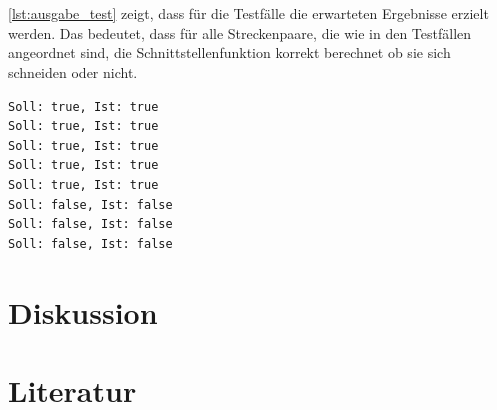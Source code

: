 \documentclass[12pt]{scrartcl}
\begin{document}
\ \\~\\
\autoref{lst:ausgabe_test} zeigt, dass für die Testfälle die erwarteten Ergebnisse erzielt werden.
Das bedeutet, dass für alle Streckenpaare, die wie in den Testfällen angeordnet sind, die Schnittstellenfunktion korrekt berechnet ob sie sich schneiden oder nicht.\\

\begin{lstlisting}[style=Terminal, caption={testing.cpp: Ausgabe Konsole},captionpos=b, label={lst:ausgabe_test}]
Soll: true, Ist: true
Soll: true, Ist: true
Soll: true, Ist: true
Soll: true, Ist: true
Soll: true, Ist: true
Soll: false, Ist: false
Soll: false, Ist: false
Soll: false, Ist: false
\end{lstlisting}

\section{Diskussion}

\section{Literatur}
\end{document}
